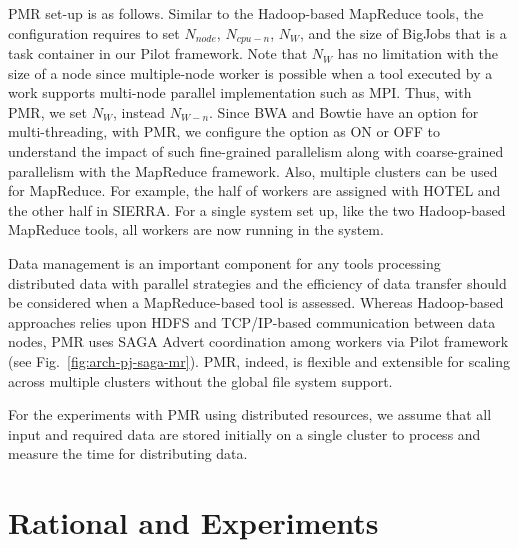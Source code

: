 \documentclass{sig-alternate}
\begin{document}
PMR set-up is as follows.  Similar to the Hadoop-based MapReduce tools, the configuration requires to set $N_{node}$, $N_{cpu-n}$, $N_W$, and the size of BigJobs that is a task container in our Pilot framework\cite{pmr2012,saga_bigjob_condor_cloud,pstar11}.  Note that $N_W$ has no limitation with the size of a node since multiple-node worker is possible when a tool executed by a work supports multi-node parallel implementation such as MPI.  Thus, with PMR, we set $N_W$, instead $N_{W-n}$.  Since BWA and Bowtie have an option for multi-threading, with PMR, we configure the option as ON or OFF to understand the impact of such fine-grained parallelism along with coarse-grained parallelism with the MapReduce framework.  Also, multiple clusters can be used for MapReduce. For example, the half of workers are assigned with HOTEL and the other half in SIERRA.  For a single system set up, like the two Hadoop-based MapReduce tools, all workers are now running in the system.  

Data management is an important component for any tools processing distributed data with parallel strategies and the efficiency of data transfer should be considered when a MapReduce-based tool is assessed.  Whereas Hadoop-based approaches relies upon HDFS and TCP/IP-based communication between data nodes, PMR uses SAGA Advert coordination among workers via Pilot framework (see Fig.~\ref{fig:arch-pj-saga-mr}).  PMR, indeed, is flexible and extensible for scaling across multiple clusters without the global file system support.  
 
 
For the experiments with PMR using distributed resources, we assume that all input and required data are stored initially on a single cluster to process and measure the time for distributing data.  


\section{Rational and Experiments}\label{sec:experiments}

\end{document}
